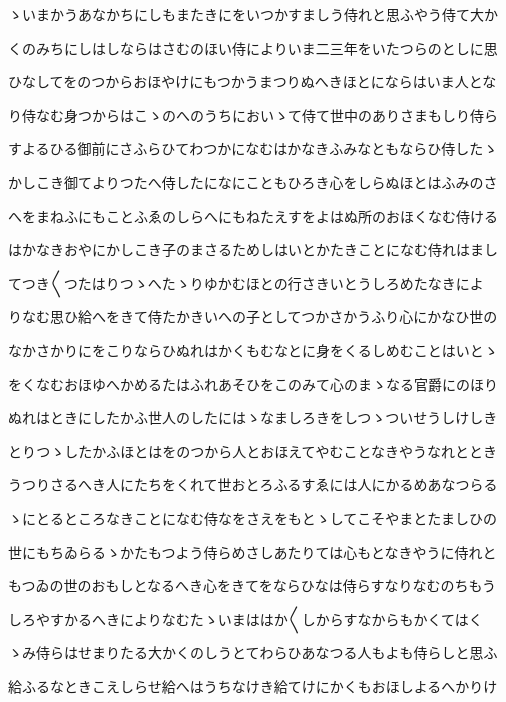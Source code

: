 \documentclass[a4paper,11pt,landscape]{ltjtarticle}
\begin{document}
\par\medskip
ゝいまかうあなかちにしもまたきにをいつかすましう侍れと思ふやう侍て大か
\par\medskip
くのみちにしはしならはさむのほい侍によりいま二三年をいたつらのとしに思
\par\medskip
ひなしてをのつからおほやけにもつかうまつりぬへきほとにならはいま人とな
\par\medskip
り侍なむ身つからはこゝのへのうちにおいゝて侍て世中のありさまもしり侍ら
\par\medskip
すよるひる御前にさふらひてわつかになむはかなきふみなともならひ侍したゝ
\par\medskip
かしこき御てよりつたへ侍したになにこともひろき心をしらぬほとはふみのさ
\par\medskip
へをまねふにもことふゑのしらへにもねたえすをよはぬ所のおほくなむ侍ける
\par\medskip
はかなきおやにかしこき子のまさるためしはいとかたきことになむ侍れはまし
\par\medskip
てつき〱つたはりつゝへたゝりゆかむほとの行さきいとうしろめたなきによ
\par\medskip
りなむ思ひ給へをきて侍たかきいへの子としてつかさかうふり心にかなひ世の
\par\medskip
なかさかりにをこりならひぬれはかくもむなとに身をくるしめむことはいとゝ
\par\medskip
をくなむおほゆへかめるたはふれあそひをこのみて心のまゝなる官爵にのほり
\par\medskip
ぬれはときにしたかふ世人のしたにはゝなましろきをしつゝついせうしけしき
\par\medskip
とりつゝしたかふほとはをのつから人とおほえてやむことなきやうなれととき
\par\medskip
うつりさるへき人にたちをくれて世おとろふるすゑには人にかるめあなつらる
\par\medskip
ゝにとるところなきことになむ侍なをさえをもとゝしてこそやまとたましひの
\par\medskip
世にもちゐらるゝかたもつよう侍らめさしあたりては心もとなきやうに侍れと
\par\medskip
もつゐの世のおもしとなるへき心をきてをならひなは侍らすなりなむのちもう
\par\medskip
しろやすかるへきによりなむたゝいまははか〱しからすなからもかくてはく
\par\medskip
ゝみ侍らはせまりたる大かくのしうとてわらひあなつる人もよも侍らしと思ふ
\par\medskip
給ふるなときこえしらせ給へはうちなけき給てけにかくもおほしよるへかりけ
\end{document}
